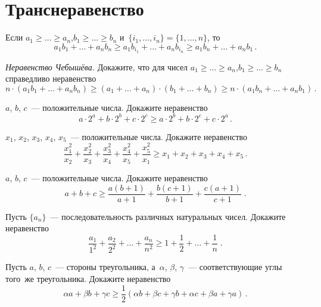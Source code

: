 
\section*{Транснеравенство}


Если
$a_{1} \geq \ldots \geq a_{n}$,\enspace $b_{1} \geq \ldots \geq b_{n}$
и~$\{ i_{1}, \ldots, i_{n} \} = \{ 1, \ldots, n \}$, то
\[
    a_{1} b_{1} + \ldots + a_{n} b_{n}
\geq
    a_{1} b_{i_{1}} + \ldots + a_{n} b_{i_{n}}
\geq
    a_{1} b_{n} + \ldots + a_{n} b_{1}
\, . \]

\begin{problems}

\item \emph{Неравенство Чебышёва.}
Докажите, что для чисел
$a_{1} \geq \ldots \geq a_{n}$,\enspace $b_{1} \geq \ldots \geq b_{n}$
справедливо неравенство
\[
    n \cdot (a_{1} b_{1} + \ldots + a_{n} b_{n})
\geq
    (a_{1} + \ldots + a_{n}) \cdot (b_{1} + \ldots + b_{n})
\geq
    n \cdot (a_{1} b_{n} + \ldots + a_{n} b_{1})
\, . \]

\item
$a$, $b$, $c$~--- положительные числа.
Докажите неравенство
\[
    a \cdot 2^{a} + b \cdot 2^{b} + c \cdot 2^{c}
\geq
    a \cdot 2^{b} + b \cdot 2^{c} + c \cdot 2^{a}
\, . \]

\item
$x_{1}$, $x_{2}$, $x_{3}$, $x_{4}$, $x_{5}$~--- положительные числа.
Докажите неравенство
\[
    \frac{x_{1}^{2}}{x_{2}} + \frac{x_{2}^{2}}{x_{3}} +
    \frac{x_{3}^{2}}{x_{4}} + \frac{x_{4}^{2}}{x_{5}} +
    \frac{x_{5}^{2}}{x_{1}}
\geq
    x_{1} + x_{2} + x_{3} + x_{4} + x_{5}
\, . \]

\item
$a$, $b$, $c$~--- положительные числа.
Докажите неравенство
\[
    a + b + c
\geq
    \frac{a (b + 1)}{a + 1} + \frac{b (c + 1)}{b + 1} +
    \frac{c (a + 1)}{c + 1}
\; . \]

\item
Пусть $\{ a_{n} \}$~--- последовательность различных натуральных чисел.
Докажите неравенство
\[
    \frac{a_{1}}{1^{2}} + \frac{a_{2}}{2^{2}} + \ldots + \frac{a_{n}}{n^{2}}
\geq
    1 + \frac{1}{2} + \ldots + \frac{1}{n}
\; . \]

\item
Пусть $a$, $b$, $c$~--- стороны треугольника, а~$\alpha$, $\beta$, $\gamma$~---
соответствующие углы того~же треугольника.
Докажите неравенство
\[
    \alpha a + \beta b + \gamma c
\geq
    \frac{1}{2}
    (\alpha b + \beta c + \gamma b + \alpha c + \beta a + \gamma a)
\, . \]


\end{problems}
